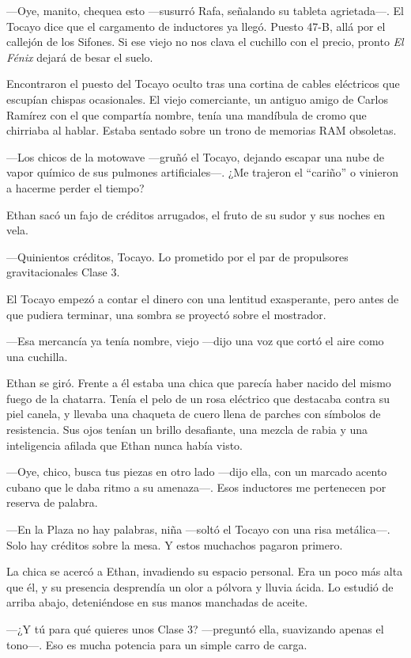 \documentclass[11pt,twoside]{book}
\begin{document}
---Oye, manito, chequea esto ---susurró Rafa, señalando su tableta agrietada---. El Tocayo dice que el cargamento de inductores ya llegó. Puesto 47-B, allá por el callejón de los Sifones. Si ese viejo no nos clava el cuchillo con el precio, pronto \textit{El Fénix} dejará de besar el suelo.

Encontraron el puesto del Tocayo oculto tras una cortina de cables eléctricos que escupían chispas ocasionales. El viejo comerciante, un antiguo amigo de Carlos Ramírez con el que compartía nombre, tenía una mandíbula de cromo que chirriaba al hablar. Estaba sentado sobre un trono de memorias RAM obsoletas.

---Los chicos de la motowave ---gruñó el Tocayo, dejando escapar una nube de vapor químico de sus pulmones artificiales---. ¿Me trajeron el ``cariño'' o vinieron a hacerme perder el tiempo?

Ethan sacó un fajo de créditos arrugados, el fruto de su sudor y sus noches en vela.

---Quinientos créditos, Tocayo. Lo prometido por el par de propulsores gravitacionales Clase 3.

El Tocayo empezó a contar el dinero con una lentitud exasperante, pero antes de que pudiera terminar, una sombra se proyectó sobre el mostrador.

---Esa mercancía ya tenía nombre, viejo ---dijo una voz que cortó el aire como una cuchilla.

Ethan se giró. Frente a él estaba una chica que parecía haber nacido del mismo fuego de la chatarra. Tenía el pelo de un rosa eléctrico que destacaba contra su piel canela, y llevaba una chaqueta de cuero llena de parches con símbolos de resistencia. Sus ojos tenían un brillo desafiante, una mezcla de rabia y una inteligencia afilada que Ethan nunca había visto.

---Oye, chico, busca tus piezas en otro lado ---dijo ella, con un marcado acento cubano que le daba ritmo a su amenaza---. Esos inductores me pertenecen por reserva de palabra.

---En la Plaza no hay palabras, niña ---soltó el Tocayo con una risa metálica---. Solo hay créditos sobre la mesa. Y estos muchachos pagaron primero.

La chica se acercó a Ethan, invadiendo su espacio personal. Era un poco más alta que él, y su presencia desprendía un olor a pólvora y lluvia ácida. Lo estudió de arriba abajo, deteniéndose en sus manos manchadas de aceite.

---¿Y tú para qué quieres unos Clase 3? ---preguntó ella, suavizando apenas el tono---. Eso es mucha potencia para un simple carro de carga.
\end{document}
